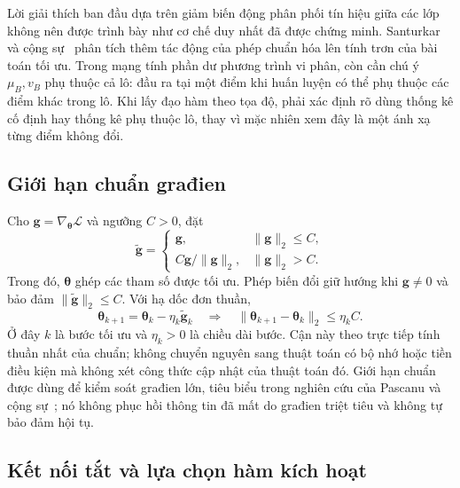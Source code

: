 Lời giải thích ban đầu dựa trên giảm biến động phân phối tín hiệu
giữa các lớp không nên được trình bày như cơ chế duy nhất đã được
chứng minh. Santurkar và cộng sự~\cite{santurkar2018} phân tích
thêm tác động của phép chuẩn hóa lên tính trơn của bài toán tối
ưu. Trong mạng tính phần dư phương trình vi phân, còn cần chú ý
$\mu_B,v_B$ phụ thuộc cả lô: đầu ra tại một điểm khi huấn luyện
có thể phụ thuộc các điểm khác trong lô. Khi lấy đạo hàm theo tọa
độ, phải xác định rõ dùng thống kê cố định hay thống kê phụ thuộc
lô, thay vì mặc nhiên xem đây là một ánh xạ từng điểm không đổi.

\subsection{Giới hạn chuẩn građien}

Cho $\mathbf g=\nabla_{\boldsymbol\theta}\mathcal L$ và ngưỡng
$C>0$, đặt
\begin{equation}
 \widetilde{\mathbf g}=
 \begin{cases}
  \mathbf g,&\|\mathbf g\|_2\leq C,\\
  C\mathbf g/\|\mathbf g\|_2,&\|\mathbf g\|_2>C.
 \end{cases}
 \label{kt:eq:clipping}
\end{equation}
Trong đó, $\boldsymbol\theta$ ghép các tham số được tối ưu.
Phép biến đổi giữ hướng khi $\mathbf g\ne0$ và bảo đảm
$\|\widetilde{\mathbf g}\|_2\leq C$. Với hạ dốc đơn thuần,
\begin{equation}
 \boldsymbol\theta_{k+1}
 =\boldsymbol\theta_k-\eta_k\widetilde{\mathbf g}_k
 \quad\Longrightarrow\quad
 \|\boldsymbol\theta_{k+1}-\boldsymbol\theta_k\|_2\leq\eta_k C.
 \label{kt:eq:clipped-step}
\end{equation}
Ở đây $k$ là bước tối ưu và $\eta_k>0$ là chiều dài bước. Cận này
theo trực tiếp tính thuần nhất của chuẩn; không chuyển nguyên
sang thuật toán có bộ nhớ hoặc tiền điều kiện mà không xét công
thức cập nhật của thuật toán đó. Giới hạn chuẩn được dùng để
kiểm soát građien lớn, tiêu biểu trong nghiên cứu của Pascanu và
cộng sự~\cite{pascanu2013}; nó không phục hồi thông tin đã mất do
građien triệt tiêu và không tự bảo đảm hội tụ.

\subsection{Kết nối tắt và lựa chọn hàm kích hoạt}

